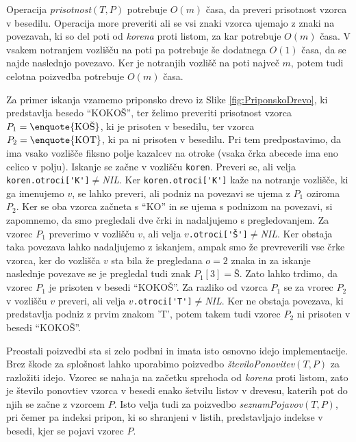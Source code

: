 Operacija \textit{prisotnost}$(T,P)$ potrebuje $O(m)$ časa, da preveri prisotnost vzorca v besedilu. Operacija more preveriti ali se vsi znaki vzorca ujemajo z znaki na povezavah, ki so del poti od \textit{korena} proti listom, za kar potrebuje $O(m)$ časa. V vsakem notranjem vozlišču na poti pa potrebuje še dodatnega $O(1)$ časa, da se najde naslednjo povezavo. Ker je notranjih vozlišč na poti največ $m$, potem tudi celotna poizvedba potrebuje $O(m)$ časa.

Za primer iskanja vzamemo priponsko drevo iz Slike \ref{fig:PriponskoDrevo}, ki predstavlja besedo \enquote{KOKOŠ}, ter želimo preveriti prisotnost vzorca $P_1=\text{\enquote{KOŠ}}$, ki je prisoten v besedilu, ter vzorca $P_2=\text{\enquote{KOT}}$, ki pa ni prisoten v besedilu. Pri tem predpostavimo, da ima vsako vozlišče fiksno polje kazalcev na otroke (vsaka črka abecede ima eno celico v polju). Iskanje se začne v vozlišču \verb|koren|. Preveri se, ali velja \verb|koren.otroci['K']|$\ne$\textit{NIL}. Ker \verb|koren.otroci['K']| kaže na notranje vozlišče, ki ga imenujemo $v$, se lahko preveri, ali podniz na povezavi se ujema z $P_1$ oziroma $P_2$. Ker se oba vzorca začneta s \enquote{KO} in se ujema s podnizom na povezavi, si zapomnemo, da smo pregledali dve črki in nadaljujemo s pregledovanjem. Za vzorec $P_1$ preverimo v vozlišču $v$, ali velja $v$\verb|.otroci['Š']|$\ne$\textit{NIL}. Ker obstaja taka povezava lahko nadaljujemo z iskanjem, ampak smo že prevreverili vse črke vzorca, ker do vozlišča $v$ sta bila že pregledana $o=2$ znaka in za iskanje naslednje povezave se je pregledal tudi znak $P_1[3]=\text{Š}$. Zato lahko trdimo, da vzorec $P_1$ je prisoten v besedi \enquote{KOKOŠ}. Za razliko od vzorca $P_1$ se za vrorec $P_2$ v vozlišču $v$ preveri, ali velja $v$\verb|.otroci['T']|$\ne$\textit{NIL}. Ker ne obstaja povezava, ki predstavlja podniz z prvim znakom 'T', potem takem tudi vzorec $P_2$ ni prisoten v besedi \enquote{KOKOŠ}.

Preostali poizvedbi sta si zelo podbni in imata isto osnovno idejo implementacije. Brez škode za splošnost lahko uporabimo poizvedbo \textit{številoPonovitev}$(T,P)$ za razložiti idejo. Vzorec se nahaja na začetku sprehoda od \textit{korena} proti listom, zato je število ponovtiev vzorca v besedi enako šetvilu listov v drevesu, katerih pot do njih se začne z vzorcem $P$. Isto velja tudi za poizvedbo \textit{seznamPojavov}$(T,P)$, pri čemer pa indeksi pripon, ki so shranjeni v listih, predstavljajo indekse v besedi, kjer se pojavi vzorec $P$.

